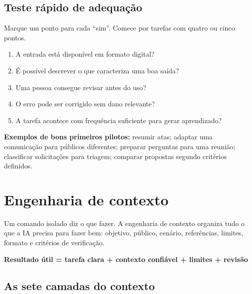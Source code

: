 \documentclass[11pt,a4paper]{article}
\begin{document}
\subsection*{Teste rápido de adequação}

Marque um ponto para cada “sim”. Comece por tarefas com quatro ou cinco pontos.

\begin{enumerate}
  \item A entrada está disponível em formato digital?
  \item É possível descrever o que caracteriza uma boa saída?
  \item Uma pessoa consegue revisar antes do uso?
  \item O erro pode ser corrigido sem dano relevante?
  \item A tarefa acontece com frequência suficiente para gerar aprendizado?
\end{enumerate}

\begin{destaque}
\textbf{Exemplos de bons primeiros pilotos:} resumir atas; adaptar uma comunicação para públicos diferentes; preparar perguntas para uma reunião; classificar solicitações para triagem; comparar propostas segundo critérios definidos.
\end{destaque}

\newpage
\section{Engenharia de contexto}

Um comando isolado diz o que fazer. A engenharia de contexto organiza tudo o que a IA precisa para fazer bem: objetivo, público, cenário, referências, limites, formato e critérios de verificação.

\begin{center}
\begin{tcolorbox}[width=.92\linewidth,colback=branddark,colframe=branddark,arc=2mm]
\centering\color{white}\large\bfseries
Resultado útil = tarefa clara + contexto confiável + limites + revisão
\end{tcolorbox}
\end{center}

\subsection{As sete camadas do contexto}
\end{document}
